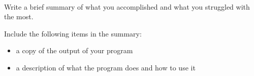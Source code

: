 \documentclass[12pt]{article}
\begin{document}
\begin{description}[labelindent=1cm]
\newpage
\item[\textbf{\underline{Tutorial Summary:}}] \hfill \vspace{3mm}\\ 
Write a brief summary of what you accomplished and what you struggled with the most. 

Include the following items in the summary:
\begin{itemize}

\item a copy of the output of your program
\item a description of what the program does and how to use it

\end{itemize}


%
%
%
%
%


\end{description}
\end{document}
